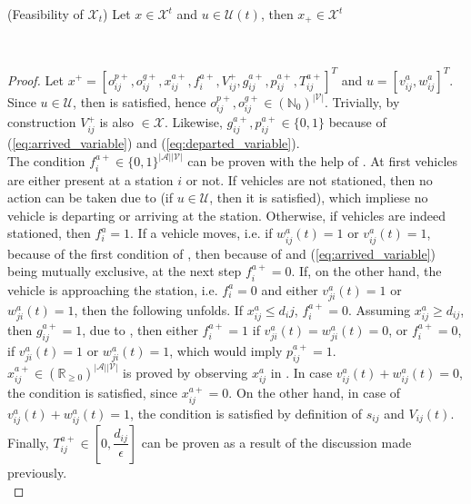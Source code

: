 \begin{proposition}{(Feasibility of $\mathcal{X}_t$)}\label{appendix:pro:feas_x}
	Let $x \in \mathcal{X}^t$ and $u \in \mathcal{U}(t)$, then $x_+ \in \mathcal{X}^t$
\end{proposition}\\
\begin{proof}
Let $x^+ = [o_{ij}^{p+}, o_{ij}^{g+}, x_{ij}^{a+}, f^{a+}_{i}, V_{ij}^{+}, g^{a+}_{ij}, p^{a+}_{ij}, T^{a+}_{ij}]^T$ and $u = [v^{a}_{ij}, w^{a}_{ij}]^T$. Since $u \in \mathcal{U}$, then  is satisfied, hence $o_{ij}^{p+}, o_{ij}^{g+} \in (\mathbb{N}_0)^{|\mathcal{V}|}$. Trivially, by construction $V_{ij}^{+}$ is also $\in \mathcal{X}$. Likewise, $g^{a+}_{ij}, p^{a+}_{ij} \in \{0,1\}$ because of (\ref{eq:arrived_variable}) and (\ref{eq:departed_variable}). \\
The condition $f^{a+}_{i} \in \{0,1\}^{|\mathcal{A}||\mathcal{V}|}$ can be proven with the help of . At first vehicles are either present at a station $i$ or not. If vehicles are not stationed, then no action can be taken due to  (if $u \in \mathcal{U}$, then it is satisfied), which impliese no vehicle is departing or arriving at the station. Otherwise, if vehicles are indeed stationed, then $f^{a}_{i} = 1$. If a vehicle moves, i.e. if $w^a_{ij}(t) = 1$ or $v^a_{ij}(t) = 1$, because of the first condition of , then because of  and (\ref{eq:arrived_variable}) being mutually exclusive, at the next step $f^{a+}_{i} =0$. If, on the other hand, the vehicle is approaching the station, i.e. $f^{a}_{i} =0$ and 
either $v^a_{ji}(t) = 1$ or $w^a_{ji}(t) = 1$, then the following unfolds. If $x_{ij}^{a} \leq d_ij$, $f^{a+}_{i} =0$. Assuming $x_{ij}^{a} \ge d_{ij}$, then $g^{a+}_{ij} = 1$, due to , then either $f^{a+}_{i} =1$ if  $v^a_{ji}(t) = w^a_{ji}(t) = 0$, or $f^{a+}_{i} =0$, if $v^a_{ji}(t) = 1$ or $w^a_{ji}(t) = 1$, which would imply $p^{a+}_{ij}=1$. \\
$x_{ij}^{a+}\in (\mathbb{R}_{\ge 0})^{|\mathcal{A}||\mathcal{V}|}$ is proved by observing $x_{ij}^a$ in  . In case $v^a_{ij}(t) + w^a_{ij}(t)= 0$, the condition is satisfied, since  $x_{ij}^{a+} = 0$.  On the other hand, in case of $v^a_{ij}(t) + w^a_{ij}(t)= 1$, the condition is satisfied by definition of $s_{ij}$ and $V_{ij}(t)$. \\
Finally, $T_{ij}^{a+} \in [0, \dfrac{d_{ij}}{\epsilon}]$ can be proven as a result of the discussion made previously. \\

\end{proof}
